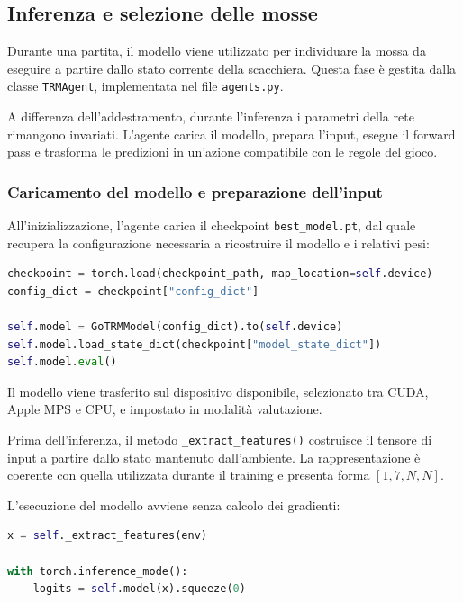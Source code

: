 \subsection{Inferenza e selezione delle mosse}

Durante una partita, il modello viene utilizzato per individuare la mossa da eseguire a partire dallo stato corrente della scacchiera. Questa fase è gestita dalla classe \texttt{TRMAgent}, implementata nel file \texttt{agents.py}.

A differenza dell'addestramento, durante l'inferenza i parametri della rete rimangono invariati. L'agente carica il modello, prepara l'input, esegue il forward pass e trasforma le predizioni in un'azione compatibile con le regole del gioco.

\subsubsection{Caricamento del modello e preparazione dell'input}

All'inizializzazione, l'agente carica il checkpoint \texttt{best\_model.pt}, dal quale recupera la configurazione necessaria a ricostruire il modello e i relativi pesi:

\begin{lstlisting}[language=Python, caption={Caricamento del modello dal checkpoint}, label={lst:inference_load}]
checkpoint = torch.load(checkpoint_path, map_location=self.device)
config_dict = checkpoint["config_dict"]

self.model = GoTRMModel(config_dict).to(self.device)
self.model.load_state_dict(checkpoint["model_state_dict"])
self.model.eval()
\end{lstlisting}

Il modello viene trasferito sul dispositivo disponibile, selezionato tra CUDA, Apple MPS e CPU, e impostato in modalità valutazione.

Prima dell'inferenza, il metodo \texttt{\_extract\_features()} costruisce il tensore di input a partire dallo stato mantenuto dall'ambiente. La rappresentazione è coerente con quella utilizzata durante il training e presenta forma \([1,7,N,N]\).

L'esecuzione del modello avviene senza calcolo dei gradienti:

\begin{lstlisting}[language=Python, caption={Esecuzione del forward pass durante l'inferenza}, label={lst:inference_forward}]
x = self._extract_features(env)

with torch.inference_mode():
    logits = self.model(x).squeeze(0)
\end{lstlisting}

